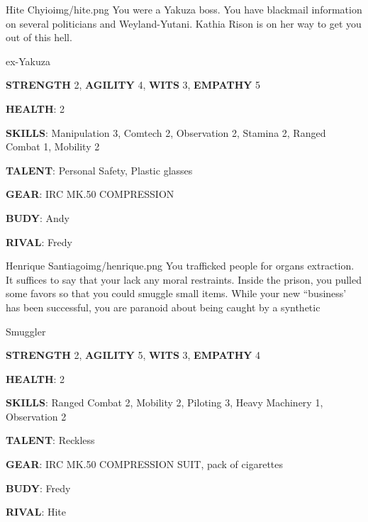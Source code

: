 \newsect

\begin{rpg-pcbox}{Hite Chyio}{img/hite.png}
    You were a Yakuza boss. You have blackmail information on several politicians and Weyland-Yutani. Kathia Rison is on her way to get you out of this hell. 
\end{rpg-pcbox}

\begin{rpg-commentbox}{}
    ex-Yakuza

    \textbf{STRENGTH} 2, \textbf{AGILITY} 4, \textbf{WITS} 3, \textbf{EMPATHY} 5

    \textbf{HEALTH}: 2

    \textbf{SKILLS}: Manipulation 3, Comtech 2, Observation 2, Stamina 2, Ranged Combat 1, Mobility 2
    
    \textbf{TALENT}: Personal Safety, Plastic glasses
    
    \textbf{GEAR}: IRC MK.50 COMPRESSION 
    
    \textbf{BUDY}: Andy
    
    \textbf{RIVAL}: Fredy
\end{rpg-commentbox}


\newsect

\medskip \medskip \medskip \medskip \medskip  \medskip \medskip \medskip \medskip \medskip \medskip \medskip \medskip \medskip \medskip  \medskip \medskip \medskip \medskip \medskip 

\begin{rpg-pcbox}{Henrique Santiago}{img/henrique.png}
    You trafficked people for organs extraction. It suffices to say that your lack any moral restraints.
    Inside the prison, you pulled some favors so that you could smuggle small items. While your new ``business' has been successful, you are paranoid about being caught by a synthetic
\end{rpg-pcbox}

\begin{rpg-commentbox}{}
    Smuggler

    \textbf{STRENGTH} 2, \textbf{AGILITY} 5, \textbf{WITS} 3, \textbf{EMPATHY} 4

    \textbf{HEALTH}: 2

    \textbf{SKILLS}: Ranged Combat 2, Mobility 2, Piloting 3, Heavy Machinery 1, Observation 2
    
    \textbf{TALENT}: Reckless
    
    \textbf{GEAR}: IRC MK.50 COMPRESSION SUIT, pack of cigarettes

    \textbf{BUDY}: Fredy
    
    \textbf{RIVAL}: Hite
\end{rpg-commentbox}


